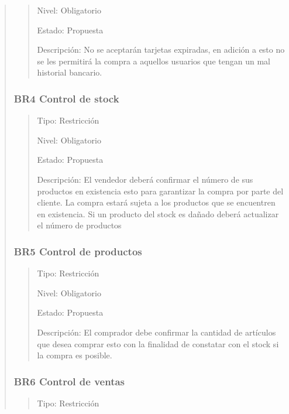 \documentclass[14pt]{article}
\begin{document}
\begin{quote}
\begin{quote}
                        Nivel: Obligatorio
    
                        Estado: Propuesta
    
                        Descripción: No se aceptarán tarjetas expiradas, en adición a esto no se les permitirá la compra a aquellos usuarios que tengan un mal historial bancario.
                    \end{quote}
                \subsubsection{BR4  Control de stock}\label{BR4  Control de stock}
                    \begin{quote}
                        Tipo: Restricción
    
                        Nivel: Obligatorio
    
                        Estado: Propuesta
    
                        Descripción: El vendedor deberá confirmar el número de sus productos en existencia esto para garantizar la compra por parte del cliente. La compra estará sujeta a los productos que se encuentren en existencia. Si un producto del stock es dañado deberá actualizar el número de productos
                    \end{quote}
                \subsubsection{BR5  Control de productos}\label{BR5  Control de productos}
                    \begin{quote}
                        Tipo: Restricción
    
                        Nivel: Obligatorio
    
                        Estado: Propuesta
    
                        Descripción: El comprador debe confirmar la cantidad de artículos que desea comprar esto con la finalidad de constatar con el stock si la compra es posible.
                    \end{quote}
                \subsubsection{BR6 Control de ventas}\label{BR6 Control de ventas}
                    \begin{quote}
                        Tipo: Restricción
    

\end{quote}
\end{quote}
\end{document}
